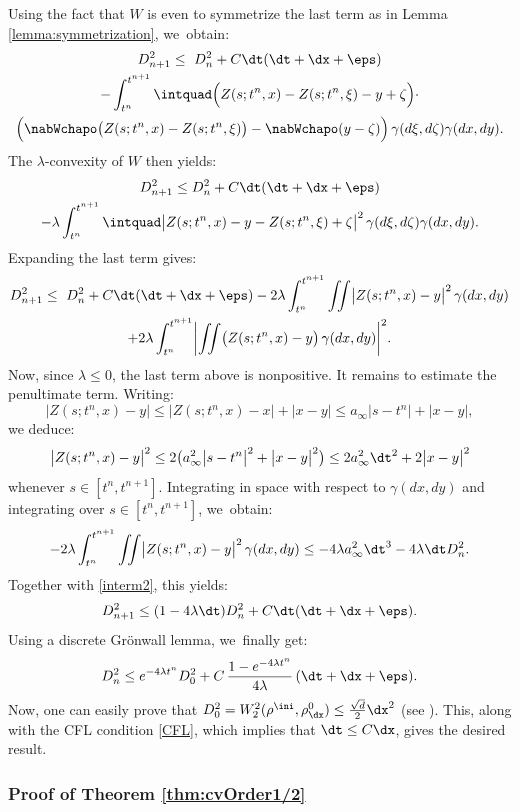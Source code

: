 Using the fact that $W$ is even to symmetrize the last term as in Lemma \ref{lemma:symmetrization}, we~obtain:
\begin{multline*}
D_{n+1}^2 \leq \ D_n^2 + C \dt(\dt+\dx+\eps) \\
- \int_{t^n}^{t^{n+1}}\intquad\Big( Z(s;t^n,x)-Z(s;t^n,\xi)-y+\zeta \Big) \cdot \\
\Big(\nabWchapo\bigl(Z(s;t^n,x)-Z(s;t^n,\xi)\bigr)-\nabWchapo(y-\zeta)\Big) \, \gamma(d\xi,d\zeta) \gamma(dx,dy).
\end{multline*}
The $\lambda$-convexity of $W$ then yields:
\begin{multline*}
D_{n+1}^2 \leq D_n^2 + C \dt(\dt+\dx+\eps) \\
- \lambda \int_{t^n}^{t^{n+1}}\intquad \bigl|Z(s;t^n,x)-y-Z(s;t^n,\xi)+\zeta\bigr|^2
\, \gamma(d\xi,d\zeta) \gamma(dx,dy).
\end{multline*}
Expanding the last term gives:
\begin{multline}\label{interm2}
D_{n+1}^2 \leq \ D_n^2 + C \dt(\dt+\dx+\eps)
- 2\lambda \int_{t^n}^{t^{n+1}} \iint \bigl|Z(s;t^n,x)-y\bigr|^2
\,\gamma(dx,dy) \\
+ 2\lambda \int_{t^n}^{t^{n+1}} \biggl\vert \iint \bigl(Z(s;t^n,x)-y\bigr)
\,\gamma(dx,dy) \biggr\vert^2. 
\end{multline}
Now, since $\lambda \leq 0$, the last term above is nonpositive. It remains to estimate the penultimate term. Writing:
\[
\bigl|Z(s;t^n,x)-y\bigr| \leq \bigl|Z(s;t^n,x)-x\bigr| + \bigl|x-y\bigr| \leq a_\infty\bigl|s-t^n\bigr| + \bigl|x-y\bigr|,
\]
we deduce:
\[
\bigl|Z(s;t^n,x)-y\bigr|^2 \leq 2\big(a_\infty^2\bigl|s-t^n\bigr|^2 + \bigl|x-y\bigr|^2\big) \leq 2a_\infty^2 \dt^2 + 2\bigl|x-y\bigr|^2
\]
whenever $s \in [t^n, t^{n+1}]$. Integrating in space with respect to $\gamma(dx, dy)$ and integrating over $s \in [t^n, t^{n+1}]$, we~obtain:
\[
- 2\lambda \int_{t^n}^{t^{n+1}} \iint \bigl|Z(s;t^n,x)-y\bigr|^2
\,\gamma(dx,dy) \leq -4\lambda a_\infty^2 \dt^3 -4\lambda \dt D_n^2.
\]
Together with \eqref{interm2}, this yields:
\[
D_{n+1}^2 \leq (1-4\lambda\dt)D_n^2 + C \dt(\dt+\dx+\eps).
\]
Using a discrete Grönwall lemma, we~finally get:
\[
D_n^2 \leq e^{-4\lambda t^n} D_0^2 + C\, \frac{1 - e^{-4\lambda t^n} }{4\lambda}\, (\dt+\dx+\eps).
\]
Now, one can easily prove that $D_0^2 = W_2^2(\rho^{\ini}, \rho_{\dx}^0) \leq \frac{\sqrt{d}}{2} \dx^2$ (see \cite{dlv17}). This, along with the CFL condition \eqref{CFL}, which implies that $\dt \leq C\dx$, gives the desired result.

\subsubsection{Proof of Theorem \ref{thm:cvOrder1/2}}


